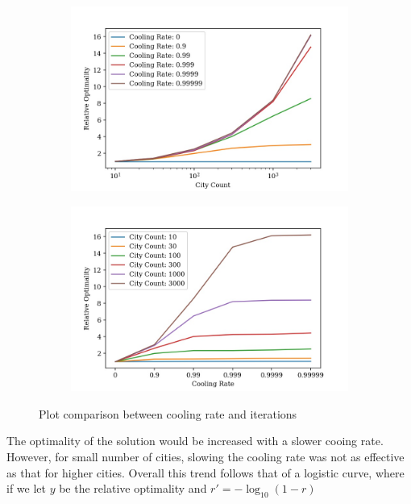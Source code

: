 \documentclass{article}
\begin{document}
\begin{figure}[H]
    \centering
    \begin{subfigure}{0.5\textwidth}
        \centering
        \includegraphics[width=1\linewidth]{images/rand_cooling_rate_city_count_distance_relative-to-base.jpg}
    \end{subfigure}%
    \begin{subfigure}{0.5\textwidth}
        \centering
        \includegraphics[width=1\linewidth]{images/rand_cooling_rate_city_count_distance_relative-to-base-transpose.jpg}
    \end{subfigure}
    \captionsetup{justification=centering}
    \caption{Plot comparison between cooling rate and iterations}
\end{figure}

The optimality of the solution would be increased with a slower cooing rate.
However, for small number of cities, slowing the cooling rate was not as effective as that for higher cities.
Overall this trend follows that of a logistic curve, where if we let $y$ be the relative optimality and $r' = -\log_{10}(1 - r)$
\end{document}
